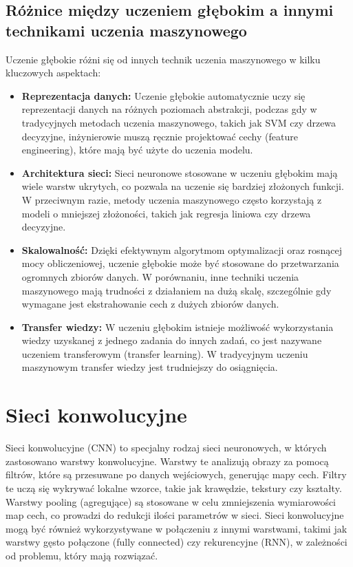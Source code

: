 \subsection{Różnice między uczeniem głębokim a innymi technikami uczenia maszynowego}
Uczenie głębokie różni się od innych technik uczenia maszynowego w kilku kluczowych aspektach:

\begin{itemize}
\item \textbf{Reprezentacja danych:} Uczenie głębokie automatycznie uczy się reprezentacji danych na różnych poziomach abstrakcji, podczas gdy w tradycyjnych metodach uczenia maszynowego, takich jak SVM czy drzewa decyzyjne, inżynierowie muszą ręcznie projektować cechy (feature engineering), które mają być użyte do uczenia modelu.
\item \textbf{Architektura sieci:} Sieci neuronowe stosowane w uczeniu głębokim mają wiele warstw ukrytych, co pozwala na uczenie się bardziej złożonych funkcji. W przeciwnym razie, metody uczenia maszynowego często korzystają z modeli o mniejszej złożoności, takich jak regresja liniowa czy drzewa decyzyjne.
\item \textbf{Skalowalność:} Dzięki efektywnym algorytmom optymalizacji oraz rosnącej mocy obliczeniowej, uczenie głębokie może być stosowane do przetwarzania ogromnych zbiorów danych. W porównaniu, inne techniki uczenia maszynowego mają trudności z działaniem na dużą skalę, szczególnie gdy wymagane jest ekstrahowanie cech z dużych zbiorów danych.
\item \textbf{Transfer wiedzy:} W uczeniu głębokim istnieje możliwość wykorzystania wiedzy uzyskanej z jednego zadania do innych zadań, co jest nazywane uczeniem transferowym (transfer learning). W tradycyjnym uczeniu maszynowym transfer wiedzy jest trudniejszy do osiągnięcia.
\end{itemize}

\section{Sieci konwolucyjne}
Sieci konwolucyjne (CNN) to specjalny rodzaj sieci neuronowych, w których zastosowano warstwy konwolucyjne. Warstwy te analizują obrazy za pomocą filtrów, które są przesuwane po danych wejściowych, generując mapy cech. Filtry te uczą się wykrywać lokalne wzorce, takie jak krawędzie, tekstury czy kształty. Warstwy pooling (agregujące) są stosowane w celu zmniejszenia wymiarowości map cech, co prowadzi do redukcji ilości parametrów w sieci. Sieci konwolucyjne mogą być również wykorzystywane w połączeniu z innymi warstwami, takimi jak warstwy gęsto połączone (fully connected) czy rekurencyjne (RNN), w zależności od problemu, który mają rozwiązać.

